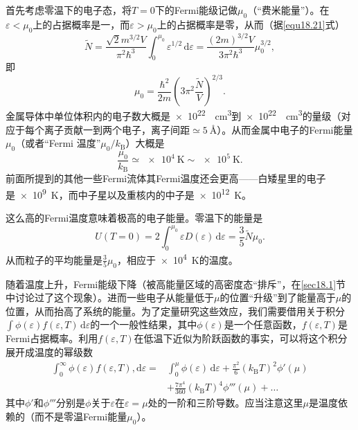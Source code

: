 首先考虑零温下的电子态，将$T=0$下的Fermi能级记做$\mu_0$（``费米能量''）。在$\varepsilon<\mu_0$上的占据概率是一，而$\varepsilon>\mu_0$上的占据概率是零，从而（据\eqref{equ18.21}式）
\begin{equation}
\tilde N=\frac{\sqrt{2}m^{3/2}V}{\pi^2\hbar^3}\int_0^{\mu_0}\varepsilon^{1/2}\,\mathrm d\varepsilon =\frac{(2m)^{3/2}V}{3\pi^2\hbar^3}\mu_0^{3/2},
\end{equation}
即
\begin{equation}
\mu_0=\frac{\hbar^2}{2m}\left(3\pi^2\frac{\tilde N}{V}\right)^{2/3}.
\label{equ18.32}
\end{equation}
金属导体中单位体积内的电子数大概是\SI{e22}{\per\cubic\centi\meter}到\SI{e22}{\per\cubic\centi\meter}的量级（对应于每个离子贡献一到两个电子，离子间距$\simeq\SI{5}{\angstrom}$）。从而金属中电子的Fermi能量$\mu_0$（或者``Fermi 温度''$\mu_0/k_\text{B}$）大概是
\begin{equation}
\frac{\mu_0}{k_\text{B}}\simeq\SI{e4}{\kelvin}\sim\SI{e5}{\kelvin}.
\end{equation}
前面所提到的其他一些Fermi流体其Fermi温度还会更高——白矮星里的电子是\SI{e9}{\kelvin}，而中子星以及重核内的中子是\SI{e12}{\kelvin}。

这么高的Fermi温度意味着极高的电子能量。零温下的能量是
\begin{equation}
U(T=0)=2\int_0^{\mu_0}\varepsilon D(\varepsilon)\,\mathrm d\varepsilon=\frac{3}{5}\tilde N\mu_0.
\label{equ18.34}
\end{equation}
从而粒子的平均能量是$\frac{3}{5}\mu_0$，相应于\SI{e4}{\kelvin}的温度。

随着温度上升，Fermi能级下降（被高能量区域的高密度态``排斥''，在\ref{sec18.1}节中讨论过了这个现象）。进而一些电子从能量低于$\mu$的位置``升级''到了能量高于$\mu$的位置，从而抬高了系统的能量。为了定量研究这些效应，我们需要借用关于积分$\int \phi(\varepsilon)f(\varepsilon,T)\,\mathrm d\varepsilon$的一个一般性结果，其中$\phi(\varepsilon)$是一个任意函数，$f(\varepsilon,T)$是Fermi占据概率。利用$f(\varepsilon,T)$在低温下近似为阶跃函数的事实，可以将这个积分展开成温度的幂级数
\begin{equation}
\begin{aligned}
\int_0^\infty\phi(\varepsilon)f(\varepsilon,T),\mathrm d\varepsilon=&\int_0^\mu\phi(\varepsilon)\,\mathrm d\varepsilon+\frac{\pi^2}{6}(k_\text{B}T)^2\phi'(\mu)\\
&+\frac{7\pi^4}{360}(k_\text{B}T)^4\phi'''(\mu)+\dots
\end{aligned}
\label{equ18.35}
\end{equation}
其中$\phi'$和$\phi'''$分别是$\phi$关于$\varepsilon$在$\varepsilon=\mu$处的一阶和三阶导数。应当注意这里$\mu$是温度依赖的（而不是零温Fermi能量$\mu_0$）。

